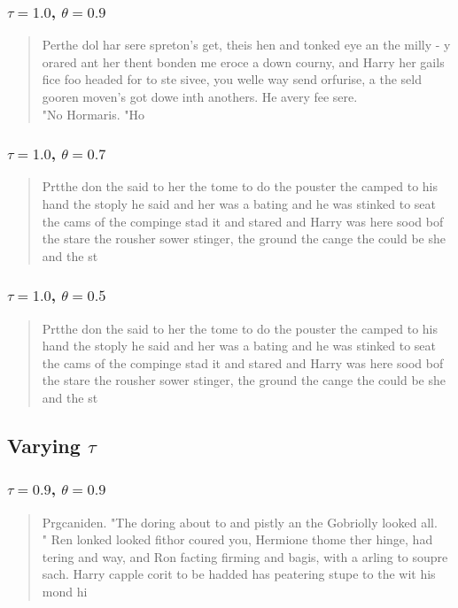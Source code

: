 \documentclass{article}
\begin{document}
\subsubsection*{$\tau=1.0$, $\theta=0.9$}
	\begin{quote}
		Perthe dol har sere spreton's get, theis hen and tonked eye an the milly - y orared ant her thent bonden me eroce a down courny, and Harry her gails fice foo headed for to ste sivee, you welle way send orfurise, a the seld gooren moven's got dowe inth anothers.  He avery fee sere.\\"No Hormaris.  "Ho 
	\end{quote}

\subsubsection*{$\tau=1.0$, $\theta=0.7$}
	\begin{quote}
		Prtthe don the said to her the tome to do the pouster the camped to his hand the stoply he said and her was a bating and he was stinked to seat the cams of the compinge stad it and stared and Harry was here sood bof the stare the rousher sower stinger, the ground the cange the could be she and the st
	\end{quote}

\subsubsection*{$\tau=1.0$, $\theta=0.5$}
	\begin{quote}
		Prtthe don the said to her the tome to do the pouster the camped to his hand the stoply he said and her was a bating and he was stinked to seat the cams of the compinge stad it and stared and Harry was here sood bof the stare the rousher sower stinger, the ground the cange the could be she and the st
	\end{quote}

\subsection*{Varying $\tau$}
\subsubsection*{$\tau=0.9$, $\theta=0.9$}
	\begin{quote}
		Prgcaniden.  "The doring about to and pistly an the Gobriolly looked all.\\" Ren lonked looked fithor coured you, Hermione thome ther hinge, had tering and way, and Ron facting firming and bagis, with a arling to soupre sach.  Harry capple corit to be hadded has peatering stupe to the wit his mond hi
	\end{quote}
\end{document}
